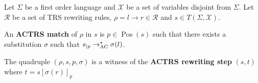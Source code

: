 \begin{definition}
  \label{def:trs:actrs}
  Let $\Sigma$ be a first order language and $\mathcal{X}$ be a set of variables disjoint from $\Sigma$.
  Let $\mathcal{R}$ be a set of TRS rewriting rules, $\rho \mathop{=} l \mathop{\to} r \mathop{\in} \mathcal{R}$ and $s \mathop{\in} T(\Sigma, \mathcal{X})$.

  An \textbf{ACTRS match} of $\rho$ in $s$ is $p \mathop{\in} \operatorname{Pos}(s)$ such that there exists a substitution $\sigma$ such that $s_{|p} \rightarrow_{\operatorname{AC}}^* \sigma(l)$. 


  The quadruple $(\rho, s, p, \sigma)$ is a witness of the \textbf{ACTRS rewriting step} $(s, t)$ where $t \mathop{=} s[\sigma(r)]_p$

\end{definition}

   


